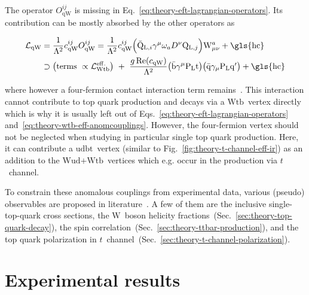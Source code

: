 The operator $O_\mathrm{qW}^{ij}$ is missing in Eq.~\ref{eq:theory-eft-lagrangian-operators}. Its contribution can be mostly absorbed by the other operators as

\begin{align}
\mathcal{L}_\mathrm{qW}&=\frac{1}{\Lambda^2}c^{ij}_\mathrm{qW}O_\mathrm{qW}^{ij}=\frac{1}{\Lambda^2}c^{ij}_\mathrm{qW}\Big(\bar{\mathrm{Q}}_{\mathrm{L},i}\gamma^{\mu}\omega_{a}D^\nu\mathrm{Q}_{\mathrm{L},j}\Big)\mathrm{W}_{\mu\nu}^{a}+\mathrm{\gls{hc}}\nonumber\\
&\supset\big(\text{terms }\propto\mathcal{L}_\mathrm{Wtb}^\mathrm{eff.}\big)~+~\frac{g\,\mathrm{Re}(c_\mathrm{qW})}{\Lambda^2}\big(\bar{\mathrm{b}}\gamma^{\mu}\mathrm{P}_\mathrm{L}\mathrm{t}\big)\big(\bar{\mathrm{q}}\gamma_\mu\mathrm{P}_\mathrm{L}\mathrm{q}^\prime\big)+\mathrm{\gls{hc}}\label{eq:theory-wtb-eff-anomcouplings}
\end{align}

where however a four-fermion contact interaction term remains~\cite{Bach:2012fb}. This interaction cannot contribute to top quark production and decays via a $\mathrm{Wtb}$~vertex directly which is why it is usually left out of Eqs.~\ref{eq:theory-eft-lagrangian-operators} and~\ref{eq:theory-wtb-eff-anomcouplings}. However, the four-fermion vertex should not be neglected when studying in particular single top quark production. Here, it can contribute a $\mathrm{udbt}$~vertex (similar to Fig.~\ref{fig:theory-t-channel-eff-ir}) as an addition to the $\mathrm{Wud}\text{+}\mathrm{Wtb}$~vertices which e.g. occur in the production via $t$~channel.

To constrain these anomalous couplings from experimental data, various (pseudo) observables are proposed in literature~\cite{AguilarSaavedra:2010nx,Aguilar-Saavedra:2014eqa,Bernreuther:2015yna}. A few of them are the inclusive single-top-quark cross sections, the $\mathrm{W}$~boson helicity fractions~(Sec.~\ref{sec:theory-top-quark-decay}), the \ttbar spin correlation~(Sec.~\ref{sec:theory-ttbar-production}), and the top quark polarization in $t$~channel~(Sec.~\ref{sec:theory-t-channel-polarization}).



\section{Experimental results}
\label{sec:theory-exp-results}

